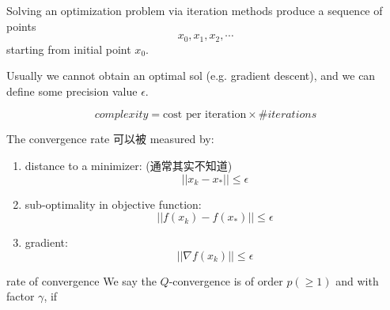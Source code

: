 \documentclass[lang=cn,11pt]{elegantbook}
\begin{document}
Solving an optimization problem via iteration methods produce a sequence of points
$$
x_0, x_1, x_2, \cdots
$$
starting from initial point $x_0$.


Usually we cannot obtain an optimal sol (e.g. gradient descent), and we can define some precision value $\epsilon$.

$$
complexity  = \text{cost per iteration} \times \#iterations
$$

The convergence rate 可以被 measured by:
\begin{enumerate}
    \item distance to a minimizer: (通常其实不知道)$$|| x_k - x_* || \leq \epsilon$$
    \item sub-optimality in objective function: $$||f( x_k) -f (x_*) || \leq \epsilon$$
    \item gradient: $$ || \nabla f(x_k)     || \leq \epsilon$$
\end{enumerate}

\begin{definition}{rate of convergence}
We say the $Q$-convergence is of order $p (\geq 1)$ and with factor $\gamma$, if 
    
\end{definition}
\end{document}
